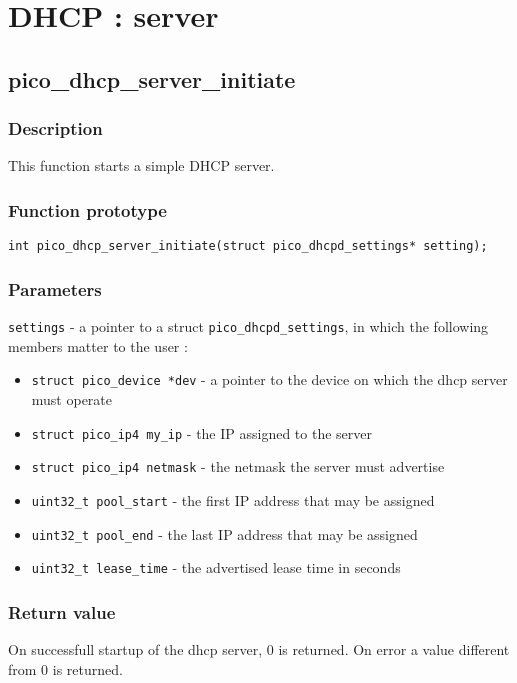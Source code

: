\section{DHCP : server}



\subsection{pico\_dhcp\_server\_initiate}


\subsubsection*{Description}
This function starts a simple DHCP server. 

\subsubsection*{Function prototype}
\texttt{int pico\_dhcp\_server\_initiate(struct pico\_dhcpd\_settings* setting);}

\subsubsection*{Parameters}
\texttt{settings} - a pointer to a struct \texttt{pico\_dhcpd\_settings}, in which the following members matter to the user : 
\begin{itemize}
\item \texttt{struct pico\_device *dev} - a pointer to the device on which the dhcp server must operate
\item \texttt{struct pico\_ip4 my\_ip} - the IP assigned to the server
\item \texttt{struct pico\_ip4 netmask} - the netmask the server must advertise
\item \texttt{uint32\_t pool\_start} - the first IP address that may be assigned
\item \texttt{uint32\_t pool\_end} - the last IP address that may be assigned
\item \texttt{uint32\_t lease\_time} - the advertised lease time in seconds
\end{itemize}

\subsubsection*{Return value}
On successfull startup of the dhcp server, 0 is returned. On error a value different from 0 is returned.


